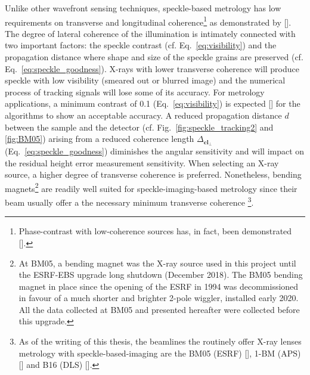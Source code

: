 \begin{refsection}
Unlike other wavefront sensing techniques, speckle-based metrology has low requirements on transverse and longitudinal coherence\footnote{Phase-contrast with low-coherence sources has, in fact, been demonstrated [\cite{Cloetens1996, Wilkins1996, Pfeiffer2006, Munro2012}].} as demonstrated by [\cite{Zanette2014,Zdora2015,Wang2016}]. The degree of lateral coherence of the illumination is intimately connected with two important factors: the speckle contrast (cf. Eq.~\ref{eq:visibility}) and the propagation distance where shape and size of the speckle grains are preserved (cf. Eq.~\ref{eq:speckle_goodness}). X-rays with lower transverse coherence will produce speckle with low visibility (smeared out or blurred image) and the numerical process of tracking signals will lose some of its accuracy. For metrology applications, a minimum contrast of 0.1 (Eq.~\ref{eq:visibility}) is expected [\cite{Berujon2020a}] for the algorithms to show an acceptable accuracy. A reduced propagation distance $d$ between the sample and the detector (cf. Fig.~\ref{fig:speckle_tracking2} and \ref{fig:BM05}) arising from a reduced coherence length $\Delta_{\textbf{cl}_\perp}$ (Eq.~\ref{eq:speckle_goodness}) diminishes the angular sensitivity and will impact on the residual height error measurement sensitivity. When selecting an X-ray source, a higher degree of transverse coherence is preferred. Nonetheless, bending magnets\footnote{At BM05, a bending magnet was the X-ray source used in this project until the ESRF-EBS upgrade long shutdown (December 2018). The BM05 bending magnet in place since the opening of the ESRF in 1994 was decommissioned in favour of a much shorter and brighter 2-pole wiggler, installed early 2020. All the data collected at BM05 and presented hereafter were collected before this upgrade.} are readily well suited for  speckle-imaging-based metrology since their beam usually offer a the necessary minimum transverse coherence  \footnote{As of the writing of this thesis, the beamlines the routinely offer X-ray lenses metrology with speckle-based-imaging are the BM05 (ESRF) [\cite{Berujon2020a}], 1-BM (APS) [\cite{Qiao2020}] and B16 (DLS) [\cite{Sawhney2013}].}. 


\end{refsection}
